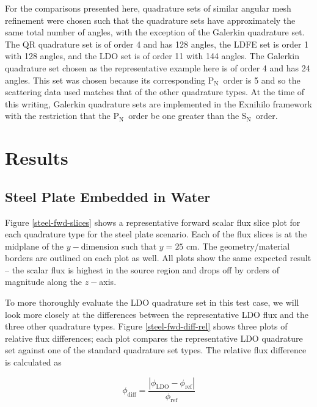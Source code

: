 \documentclass{article} %
\newcommand{\sn}{S$_\mathrm{N}$}
\newcommand{\pn}{P$_\mathrm{N}$}
\begin{document}
For the comparisons presented here, quadrature sets of similar angular mesh
refinement were chosen such that the quadrature sets have approximately the 
same total number of angles, with the exception of the Galerkin quadrature set.
The QR quadrature set is of order 4 and has 128 angles, the LDFE set is order 1
with 128 angles, and the LDO set is of order 11 with 144 angles. 
The Galerkin quadrature set chosen as the representative example here is of
order 4 and has 24 angles. This set was chosen because its corresponding \pn\
order is 5 and so the scattering data used matches that of the other quadrature
types. At the time of this writing, Galerkin quadrature sets are implemented in
the Exnihilo framework with the restriction that the \pn\ order be one greater
than the \sn\ order.

\section{Results}
\label{sec:results}

\subsection{Steel Plate Embedded in Water}

Figure \ref{steel-fwd-slices} shows a representative forward scalar flux slice
plot for each quadrature type for the steel plate scenario. 
Each of the flux slices is at the midplane of
the $y-$dimension such that $y = 25$ cm. The geometry/material borders are
outlined on each plot as well. All plots show the same expected result -- the
scalar flux is highest in the source region and drops off by orders of
magnitude along the $z-$axis.

To more thoroughly evaluate the LDO quadrature set in this test case, we will
look more closely at the differences between the representative LDO flux and
the three other quadrature types. Figure \ref{steel-fwd-diff-rel} shows three
plots of relative flux differences; each plot compares the representative LDO
quadrature set against one of the standard quadrature set types. The relative
flux difference is calculated as

\begin{equation}
\phi_{\mathrm{diff}} = 
\frac{\left|\phi_{\mathrm{LDO}}-\phi_{\mathrm{ref}}\right|}{\phi_{\mathrm{ref}}}
\label{flux-diff}
\end{equation}
\end{document}
